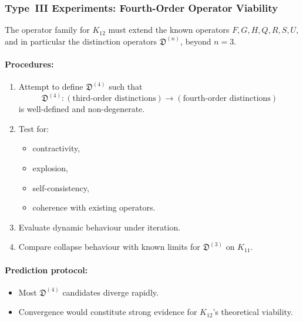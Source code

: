 \subsubsection{Type~III Experiments: Fourth-Order Operator Viability}

The operator family for $K_{12}$ must extend the known operators 
$F, G, H, Q, R, S, U$, and in particular the distinction operators 
$\mathfrak{D}^{(n)}$, beyond $n=3$.

\paragraph{Procedures:}

\begin{enumerate}
    \item Attempt to define $\mathfrak{D}^{(4)}$ such that
          \[
              \mathfrak{D}^{(4)} :
               (\text{third-order distinctions})
               \longrightarrow
               (\text{fourth-order distinctions})
          \]
          is well-defined and non-degenerate.
    \item Test for:
          \begin{itemize}
              \item contractivity,
              \item explosion,
              \item self-consistency,
              \item coherence with existing operators.
          \end{itemize}
    \item Evaluate dynamic behaviour under iteration.
    \item Compare collapse behaviour with known limits for 
          $\mathfrak{D}^{(3)}$ on $K_{11}$.
\end{enumerate}

\paragraph{Prediction protocol:}

\begin{itemize}
    \item Most $\mathfrak{D}^{(4)}$ candidates diverge rapidly.
    \item Convergence would constitute strong evidence for $K_{12}$'s 
          theoretical viability.
\end{itemize}



